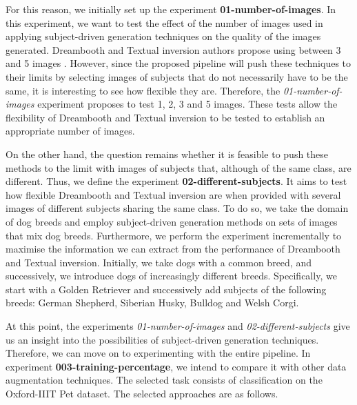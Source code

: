 For this reason, we initially set up the experiment \textbf{01-number-of-images}. In this experiment, we want to test the effect of the number of images used in applying subject-driven generation techniques on the quality of the images generated. Dreambooth and Textual inversion authors propose using between 3 and 5 images \cite{ruiz2023dreambooth, gal2022image}. However, since the proposed pipeline will push these techniques to their limits by selecting images of subjects that do not necessarily have to be the same, it is interesting to see how flexible they are. Therefore, the \textit{01-number-of-images} experiment proposes to test 1, 2, 3 and 5 images. These tests allow the flexibility of Dreambooth and Textual inversion to be tested to establish an appropriate number of images.

On the other hand, the question remains whether it is feasible to push these methods to the limit with images of subjects that, although of the same class, are different. Thus, we define the experiment \textbf{02-different-subjects}. It aims to test how flexible Dreambooth and Textual inversion are when provided with several images of different subjects sharing the same class. To do so, we take the domain of dog breeds and employ subject-driven generation methods on sets of images that mix dog breeds. Furthermore, we perform the experiment incrementally to maximise the information we can extract from the performance of Dreambooth and Textual inversion. Initially, we take dogs with a common breed, and successively, we introduce dogs of increasingly different breeds. Specifically, we start with a Golden Retriever and successively add subjects of the following breeds: German Shepherd, Siberian Husky, Bulldog and Welsh Corgi.

At this point, the experiments \textit{01-number-of-images} and \textit{02-different-subjects} give us an insight into the possibilities of subject-driven generation techniques. Therefore, we can move on to experimenting with the entire pipeline. In experiment \textbf{003-training-percentage}, we intend to compare it with other data augmentation techniques. The selected task consists of classification on the Oxford-IIIT Pet dataset. The selected approaches are as follows.

